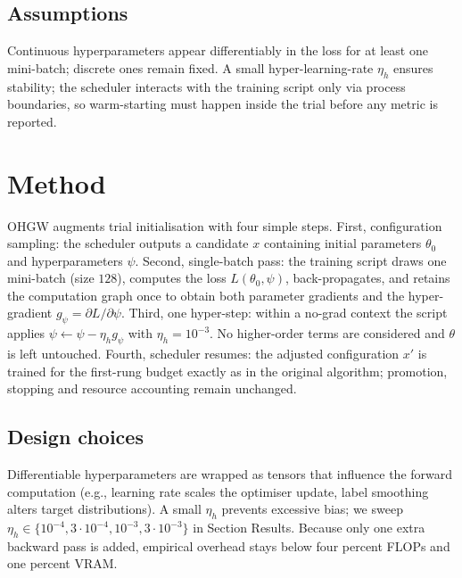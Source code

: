 \documentclass{article}
\begin{document}
\subsection{Assumptions}
Continuous hyperparameters appear differentiably in the loss for at least one mini-batch; discrete ones remain fixed. A small hyper-learning-rate $\eta_h$ ensures stability; the scheduler interacts with the training script only via process boundaries, so warm-starting must happen inside the trial before any metric is reported.

\section{Method}
OHGW augments trial initialisation with four simple steps. First, configuration sampling: the scheduler outputs a candidate $x$ containing initial parameters $\theta_0$ and hyperparameters $\psi$. Second, single-batch pass: the training script draws one mini-batch (size $128$), computes the loss $L(\theta_0, \psi)$, back-propagates, and retains the computation graph once to obtain both parameter gradients and the hyper-gradient $g_\psi = \partial L/\partial \psi$. Third, one hyper-step: within a no-grad context the script applies $\psi \leftarrow \psi - \eta_h g_\psi$ with $\eta_h = 10^{-3}$. No higher-order terms are considered and $\theta$ is left untouched. Fourth, scheduler resumes: the adjusted configuration $x'$ is trained for the first-rung budget exactly as in the original algorithm; promotion, stopping and resource accounting remain unchanged.

\subsection{Design choices}
Differentiable hyperparameters are wrapped as tensors that influence the forward computation (e.g., learning rate scales the optimiser update, label smoothing alters target distributions). A small $\eta_h$ prevents excessive bias; we sweep $\eta_h \in \{10^{-4}, 3\cdot 10^{-4}, 10^{-3}, 3\cdot 10^{-3}\}$ in Section Results. Because only one extra backward pass is added, empirical overhead stays below four percent FLOPs and one percent VRAM.
\end{document}
